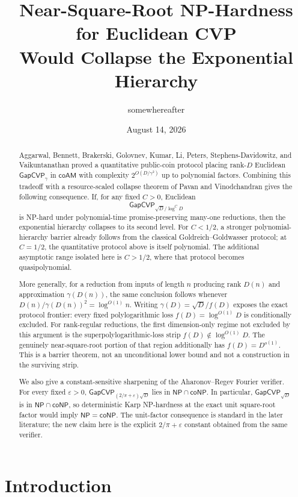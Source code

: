 \documentclass[11pt]{article}
\title{Near-Square-Root NP-Hardness for Euclidean CVP\\
Would Collapse the Exponential Hierarchy}
\author{somewhereafter}
\date{August 14, 2026}
\newcommand{\GapCVP}{\mathsf{GapCVP}}
\newcommand{\coAM}{\mathsf{coAM}}
\begin{document}
\maketitle

\begin{abstract}
Aggarwal, Bennett, Brakerski, Golovnev, Kumar, Li, Peters,
Stephens-Davidowitz, and Vaikuntanathan proved a quantitative public-coin
protocol placing rank-$D$ Euclidean $\GapCVP_\gamma$ in $\coAM$ with
complexity $2^{O(D/\gamma^2)}$ up to polynomial factors.  Combining this
tradeoff with a resource-scaled collapse theorem of Pavan and Vinodchandran
gives the following consequence.  If, for any fixed $C>0$, Euclidean
\[
  \GapCVP_{\sqrt D/\log^C D}
\]
is NP-hard under polynomial-time promise-preserving many-one reductions,
then the exponential hierarchy collapses to its second level.  For
$C<1/2$, a stronger polynomial-hierarchy barrier already follows from the
classical Goldreich--Goldwasser protocol; at $C=1/2$, the quantitative
protocol above is itself polynomial.  The additional asymptotic range
isolated here is $C>1/2$, where that protocol becomes quasipolynomial.

More generally, for a reduction from inputs of length $n$ producing rank
$D(n)$ and approximation $\gamma(D(n))$, the same conclusion follows whenever
$D(n)/\gamma(D(n))^2=\log^{O(1)}n$.  Writing
$\gamma(D)=\sqrt D/f(D)$ exposes the exact protocol frontier: every fixed
polylogarithmic loss $f(D)=\log^{O(1)}D$ is conditionally excluded.  For
rank-regular reductions, the first dimension-only regime not excluded by this
argument is the superpolylogarithmic-loss strip
$f(D)\notin\log^{O(1)}D$.  The genuinely near-square-root portion of that
  region additionally has $f(D)=D^{o(1)}$.  This is a barrier theorem, not an
  unconditional lower bound and not a construction in the surviving strip.

We also give a constant-sensitive sharpening of the Aharonov--Regev
Fourier verifier.  For every fixed $\varepsilon>0$,
$\GapCVP_{(2/\pi+\varepsilon)\sqrt D}$ lies in
$\mathsf{NP}\cap\mathsf{coNP}$.  In particular,
$\GapCVP_{\sqrt D}$ is in $\mathsf{NP}\cap\mathsf{coNP}$, so deterministic
Karp NP-hardness at the exact unit square-root factor would imply
$\mathsf{NP}=\mathsf{coNP}$.  The unit-factor consequence is standard in the
later literature; the new claim here is the explicit $2/\pi+\varepsilon$
constant obtained from the same verifier.
\end{abstract}

\section{Introduction}
\end{document}
